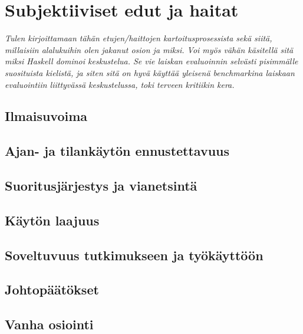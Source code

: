 
\section{Subjektiiviset edut ja haitat} \label{subjektiiviset-edut}

\textit{Tulen kirjoittamaan tähän etujen/haittojen kartoitusprosessista sekä siitä, millaisiin alalukuihin olen jakanut osion ja miksi. Voi myös vähän käsitellä sitä miksi Haskell dominoi keskustelua. Se vie laiskan evaluoinnin selvästi pisimmälle suosituista kielistä, ja siten sitä on hyvä käyttää yleisenä benchmarkina laiskaan evaluointiin liittyvässä keskustelussa, toki terveen kritiikin kera. }

\subsection{Ilmaisuvoima}

\subsection{Ajan- ja tilankäytön ennustettavuus}
\subsection{Suoritusjärjestys ja vianetsintä}
\subsection{Käytön laajuus}
\subsection{Soveltuvuus tutkimukseen ja työkäyttöön}
\subsection{Johtopäätökset}

\subsection{Vanha osiointi}


